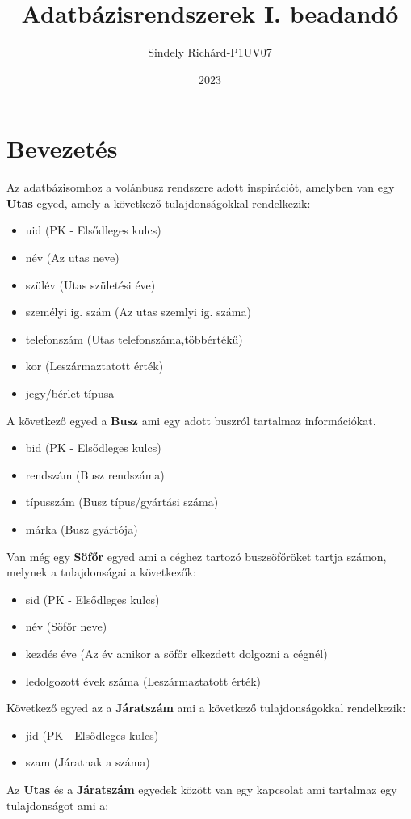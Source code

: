 \documentclass[12pt]{article}
\author{Sindely Richárd-P1UV07}
\title{Adatbázisrendszerek I. beadandó}
\date{2023}
\begin{document}
\maketitle
\newpage
\tableofcontents
\newpage
\section{Bevezetés}
\label{bev}
Az adatbázisomhoz a volánbusz rendszere adott inspirációt, amelyben van egy \textbf{Utas} egyed, amely a következő tulajdonságokkal rendelkezik:
\begin{itemize}
\item uid (PK - Elsődleges kulcs)
\item név (Az utas neve)
\item szülév (Utas születési éve)
\item személyi ig. szám (Az utas szemlyi ig. száma)
\item telefonszám (Utas telefonszáma,többértékű)
\item kor (Leszármaztatott érték)
\item jegy/bérlet típusa
\end{itemize}
A következő egyed a \textbf{Busz} ami egy adott buszról tartalmaz információkat.
\begin{itemize}
\item bid (PK - Elsődleges kulcs)
\item rendszám (Busz rendszáma)
\item típusszám (Busz típus/gyártási száma)
\item márka (Busz gyártója)
\end{itemize}
Van még egy \textbf{Söfőr} egyed ami a céghez tartozó buszsöfőröket tartja számon, melynek a tulajdonságai a következők:
\begin{itemize}
\item sid (PK - Elsődleges kulcs)
\item név (Söfőr neve)
\item kezdés éve (Az év amikor a söfőr elkezdett dolgozni a cégnél)
\item ledolgozott évek száma (Leszármaztatott érték)
\end{itemize}
Következő egyed az a \textbf{Járatszám} ami a következő tulajdonságokkal rendelkezik:
\begin{itemize}
\item jid (PK - Elsődleges kulcs)
\item szam (Járatnak a száma)
\end{itemize}
Az \textbf{Utas} és a \textbf{Járatszám} egyedek között van egy kapcsolat ami tartalmaz egy tulajdonságot ami a:
\end{document}
